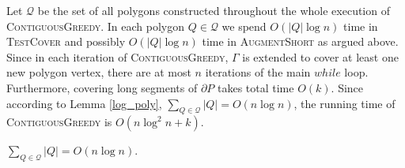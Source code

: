 \documentclass{llncs}
\begin{document}
Let $\mathcal{Q}$ be the set of all polygons constructed throughout the whole execution of \textsc{ContiguousGreedy}. In each polygon $Q\in \mathcal{Q}$ we spend $O(|Q|\log n)$ time in \textsc{TestCover} and possibly $O(|Q| \log n)$ time in \textsc{AugmentShort} as argued above. Since in each iteration of \textsc{ContiguousGreedy}, $\Gamma$ is extended to cover at least one new polygon vertex, there are at most $n$ iterations of the main $while$ loop. Furthermore,  covering long segments of $\partial P$ takes total time $O(k)$. Since according to Lemma \ref{log_poly}, $\sum_{Q \in \mathcal{Q}}|Q| = O(n \log n)$, the running time of \textsc{ContiguousGreedy} is $O(n \log^2 n + k)$. 
\vspace{5pt}
\begin{lemma}
$\sum_{Q \in \mathcal{Q}} |Q| = O(n \log n)$.
\label{log_poly}
\end{lemma}
\end{document}
